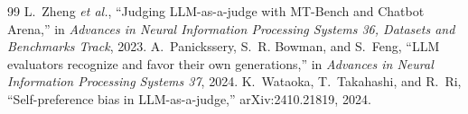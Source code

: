 \documentclass[conference,letterpaper]{IEEEtran}
\begin{document}
\begin{thebibliography}{99}
 L.~Zheng \emph{et al.}, ``Judging LLM-as-a-judge with MT-Bench and Chatbot Arena,'' in \emph{Advances in Neural Information Processing Systems 36, Datasets and Benchmarks Track}, 2023.
 A.~Panickssery, S.~R. Bowman, and S.~Feng, ``LLM evaluators recognize and favor their own generations,'' in \emph{Advances in Neural Information Processing Systems 37}, 2024.
 K.~Wataoka, T.~Takahashi, and R.~Ri, ``Self-preference bias in LLM-as-a-judge,'' arXiv:2410.21819, 2024.
\end{thebibliography}
\end{document}
